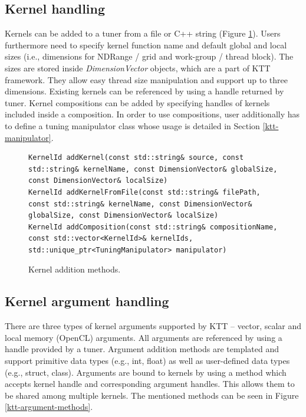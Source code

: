 \documentclass
[
    digital, %
    oneside, %
    table, %
    nolof, %
    nolot, %
    nocover %
]{fithesis3}
\begin{document}
\subsection{Kernel handling}
Kernels can be added to a tuner from a file or C++ string (Figure \ref{ktt-kernel-methods}). Users furthermore need to specify kernel function name and
default global and local sizes (i.e., dimensions for NDRange / grid and work-group / thread block). The sizes are stored inside \textit{DimensionVector}
objects, which are a part of KTT framework. They allow easy thread size manipulation and support up to three dimensions. Existing kernels can be referenced
by using a handle returned by tuner. Kernel compositions can be added by specifying handles of kernels included inside a composition. In order to use
compositions, user additionally has to define a tuning manipulator class whose usage is detailed in Section \ref{ktt-manipulator}.

\begin{figure}
\begin{adjustwidth}{-1cm}{-1cm}
\begin{lstlisting}
KernelId addKernel(const std::string& source, const std::string& kernelName, const DimensionVector& globalSize, const DimensionVector& localSize)
KernelId addKernelFromFile(const std::string& filePath, const std::string& kernelName, const DimensionVector& globalSize, const DimensionVector& localSize)
KernelId addComposition(const std::string& compositionName, const std::vector<KernelId>& kernelIds, std::unique_ptr<TuningManipulator> manipulator)
\end{lstlisting}
\caption{Kernel addition methods.}
\label{ktt-kernel-methods}
\end{adjustwidth}
\end{figure}

\subsection{Kernel argument handling}
There are three types of kernel arguments supported by KTT -- vector, scalar and local memory (OpenCL) arguments. All arguments are referenced by using
a handle provided by a tuner. Argument addition methods are templated and support primitive data types (e.g., int, float) as well as user-defined data
types (e.g., struct, class). Arguments are bound to kernels by using a method which accepts kernel handle and corresponding argument handles. This allows
them to be shared among multiple kernels. The mentioned methods can be seen in Figure \ref{ktt-argument-methods}.
\end{document}
